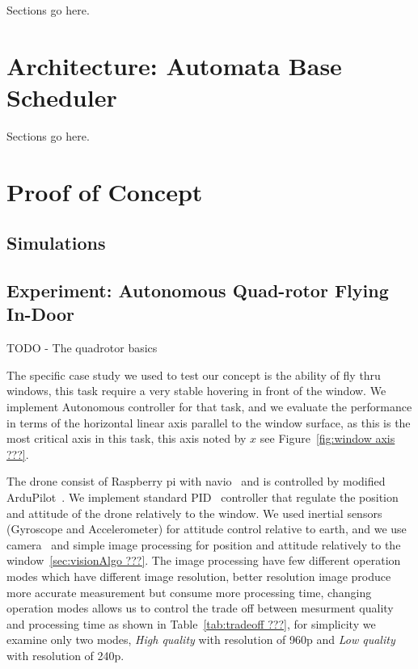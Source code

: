 \documentclass{sig-alternate-ipsn13}
\begin{document}
Sections go here.

\section{Architecture: Automata Base Scheduler}

Sections go here.

\section{Proof of Concept}
\label{sec:concept}

\subsection{Simulations}
\label{sec:simulation}

\subsection{Experiment: Autonomous Quad-rotor Flying In-Door}

TODO - The quadrotor basics

The specific case study we used to test our concept is the ability of fly thru windows, this task require a very stable hovering in front of the window.
We implement Autonomous controller for that task, and we evaluate the performance in terms of the horizontal linear axis parallel to the window surface, as this is the most critical axis in this task, this axis noted by $x$ see Figure~\ref{fig:window axis ???}.

The drone consist of Raspberry pi with navio~\cite{??? raspberry, navio} and is controlled by modified ArduPilot~\cite{??? APM}.
We implement standard PID~\cite{??? PID} controller that regulate the position and attitude of the drone relatively to the window.
We used inertial sensors (Gyroscope and Accelerometer) for attitude control relative to earth, and we use camera~\cite{??? picam} and simple image processing for position and attitude relatively to the window~\ref{sec:visionAlgo ???}.
The image processing have few different operation modes which have different image resolution, better resolution image produce more accurate measurement but consume more processing time, changing operation modes allows us to control the trade off between mesurment quality and processing time as shown in Table~\ref{tab:tradeoff ???}, for simplicity we examine only two modes, \textit{High quality} with resolution of 960p and \textit{Low quality} with resolution of 240p.
\end{document}
